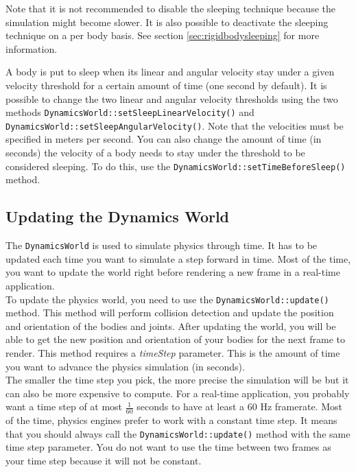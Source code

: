 \documentclass[a4paper,12pt]{article}
\begin{document}
    Note that it is not recommended to disable the sleeping technique because the simulation might become slower. It is also possible to deactivate the sleeping technique on a
    per body basis. See section \ref{sec:rigidbodysleeping} for more information. \\

    \begin{sloppypar}
      A body is put to sleep when its linear and angular velocity stay under a given velocity threshold for a certain amount of time (one second by default). It is possible to
      change the two
      linear and angular velocity thresholds using the two methods \texttt{DynamicsWorld::setSleepLinearVelocity()} and \texttt{DynamicsWorld::setSleepAngularVelocity()}.
      Note that the velocities must
      be specified in meters per second. You can also change the amount of time (in seconds) the velocity of a body needs to stay under the threshold to be considered
      sleeping. To do this, use the
    \texttt{DynamicsWorld::setTimeBeforeSleep()} method.
   \end{sloppypar}

    \subsection{Updating the Dynamics World}
    \label{sec:updating_dynamics_world}

    The \texttt{DynamicsWorld} is used to simulate physics through time. It has to be updated each time you want to simulate a step forward in time. Most of the time,
    you want to update the world right before rendering a new frame in a real-time application. \\

    To update the physics world, you need to use the \texttt{DynamicsWorld::update()} method. This method will perform collision detection and update the
    position and orientation of the bodies and joints. After updating the world, you will be able to get the new position and orientation of your bodies for the next
    frame to render. This method requires a \emph{timeStep} parameter. This is the amount of time you want to advance the physics simulation (in seconds). \\

    The smaller the time step you pick, the more precise the simulation will be but it can also be more expensive to compute. For a real-time application, you
    probably want a time step of at most $\frac{1}{60}$ seconds to
    have at least a 60 Hz framerate. Most of the time, physics engines prefer to work with a constant time step. It means that you should always call
    the \texttt{DynamicsWorld::update()} method with the same time step parameter. You do not want to use the time between two frames as your time step because it will
    not be constant. \\
\end{document}
